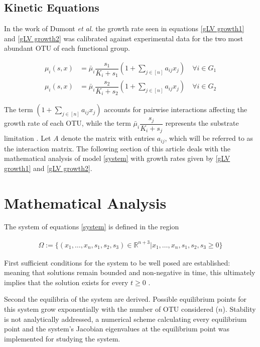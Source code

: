 \documentclass[3p,times]{elsarticle}
\newcommand{\R}{\mathbb{R}}
\begin{document}
\subsection{Kinetic Equations}
In the work of Dumont \textit{et al.} \cite{Dumont2016} the growth rate seen in equations \eqref{gLV growth1} and \eqref{gLV growth2} was calibrated against experimental data for the two most abundant OTU of each functional group.

\begin{align}
\label{gLV growth1}\mu_i(s,x) &= \bar{\mu}_i \dfrac{s_1}{K_i + s_1}\left(1+\sum \limits_{j\in [n]} a_{ij} x_{j} \right) \quad \forall i \in G_1 \\
\label{gLV growth2}\mu_i(s,x) &= \bar{\mu}_i \dfrac{s_2}{K_i + s_2}\left(1+\sum \limits_{j\in [n]} a_{ij} x_{j} \right) \quad \forall i \in G_2 
\end{align}

The term $\left(1+\sum \limits_{j\in [n]} a_{ij} x_{j} \right)$ accounts for pairwise interactions affecting the growth rate of each OTU, while the term $\bar{\mu}_i\dfrac{s_j}{K_i + s_j}$ represents the substrate limitation \cite{monod1942recherches}. Let $A$ denote the matrix
with entries $a_{ij}$, which will be referred to as the interaction matrix. The following section of this article deals with the mathematical analysis of model \eqref{system} with growth rates given by \eqref{gLV growth1} and \eqref{gLV growth2}.

\section{Mathematical Analysis}

The system of equations \eqref{system} is defined in the region 

\begin{align*}
\Omega := \{ (x_1,\dots,x_n,s_1,s_2,s_3)\in  \R^{n+3} | x_1,\dots,x_n,s_1,s_2,s_3  \geq 0  \}
\end{align*}

First sufficient conditions for the system to be well posed are established: meaning that solutions remain bounded and non-negative in time, this ultimately implies that the solution exists for every $t \geq 0$ \cite{Khalil1996}. 

Second the equilibria of the system are derived. Possible equilibrium points for this system grow exponentially with the number of OTU considered ($n$).  Stability is not analytically addressed, a numerical scheme calculating every equilibrium point and the system's Jacobian eigenvalues at the equilibrium point was implemented for studying the system. 
\end{document}
